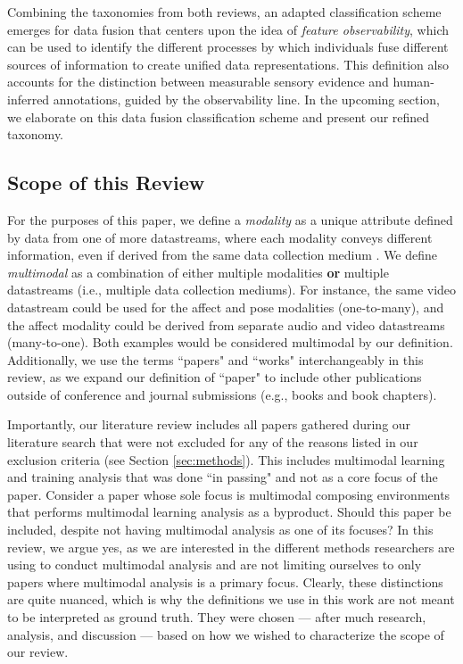 \documentclass[manuscript,screen,review]{acmart}
\begin{document}
Combining the taxonomies from both reviews, an adapted classification scheme emerges for data fusion that centers upon the idea of \textit{feature observability}, which can be used to identify the different processes by which individuals fuse different sources of information to create unified data representations. This definition also accounts for the distinction between measurable sensory evidence and human-inferred annotations, guided by the observability line. In the upcoming section, we elaborate on this data fusion classification scheme and present our refined taxonomy.

\subsection{Scope of this Review}

For the purposes of this paper, we define a \textit{modality} as a unique attribute defined by data from one of more datastreams, where each modality conveys different information, even if derived from the same data collection medium \cite{ochoa2017multimodal}. We define \textit{multimodal} as a combination of either multiple modalities \textbf{or} multiple datastreams (i.e., multiple data collection mediums). For instance, the same video datastream could be used for the affect and pose modalities (one-to-many), and the affect modality could be derived from separate audio and video datastreams (many-to-one). Both examples would be considered multimodal by our definition. Additionally, we use the terms ``papers" and ``works" interchangeably in this review, as we expand our definition of ``paper" to include other publications outside of conference and journal submissions (e.g., books and book chapters).

Importantly, our literature review includes all papers gathered during our literature search that were not excluded for any of the reasons listed in our exclusion criteria (see Section \ref{sec:methods}). This includes multimodal learning and training analysis that was done ``in passing" and not as a core focus of the paper. Consider a paper whose sole focus is multimodal composing environments that performs multimodal learning analysis as a byproduct. Should this paper be included, despite not having multimodal analysis as one of its focuses? In this review, we argue yes, as we are interested in the different methods researchers are using to conduct multimodal analysis and are not limiting ourselves to only papers where multimodal analysis is a primary focus. Clearly, these distinctions are quite nuanced, which is why the definitions we use in this work are not meant to be interpreted as ground truth. They were chosen --- after much research, analysis, and discussion --- based on how we wished to characterize the scope of our review.
\end{document}

